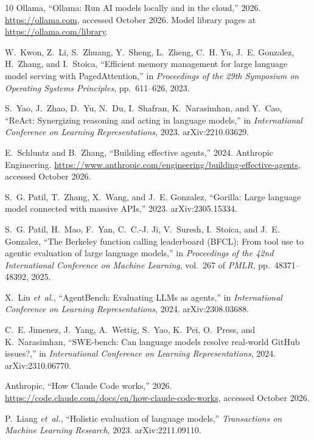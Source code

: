 \documentclass[11pt]{article}
\begin{document}
\begin{thebibliography}{10}
{Ollama}, ``{Ollama}: Run {AI} models locally and in the cloud,'' 2026.
\newblock \url{https://ollama.com}, accessed October 2026. Model library pages
  at \url{https://ollama.com/library}.

W.~Kwon, Z.~Li, S.~Zhuang, Y.~Sheng, L.~Zheng, C.~H. Yu, J.~E. Gonzalez,
  H.~Zhang, and I.~Stoica, ``Efficient memory management for large language
  model serving with {PagedAttention},'' in {\em Proceedings of the 29th
  Symposium on Operating Systems Principles}, pp.~611--626, 2023.

S.~Yao, J.~Zhao, D.~Yu, N.~Du, I.~Shafran, K.~Narasimhan, and Y.~Cao,
  ``{ReAct}: Synergizing reasoning and acting in language models,'' in {\em
  International Conference on Learning Representations}, 2023.
\newblock arXiv:2210.03629.

E.~Schluntz and B.~Zhang, ``Building effective agents,'' 2024.
\newblock Anthropic Engineering.
  \url{https://www.anthropic.com/engineering/building-effective-agents},
  accessed October 2026.

S.~G. Patil, T.~Zhang, X.~Wang, and J.~E. Gonzalez, ``Gorilla: Large language
  model connected with massive {APIs},'' 2023.
\newblock arXiv:2305.15334.

S.~G. Patil, H.~Mao, F.~Yan, C.~C.-J. Ji, V.~Suresh, I.~Stoica, and J.~E.
  Gonzalez, ``The {Berkeley} function calling leaderboard ({BFCL}): From tool
  use to agentic evaluation of large language models,'' in {\em Proceedings of
  the 42nd International Conference on Machine Learning}, vol.~267 of {\em
  PMLR}, pp.~48371--48392, 2025.

X.~Liu {\em et~al.}, ``{AgentBench}: Evaluating {LLMs} as agents,'' in {\em
  International Conference on Learning Representations}, 2024.
\newblock arXiv:2308.03688.

C.~E. Jimenez, J.~Yang, A.~Wettig, S.~Yao, K.~Pei, O.~Press, and K.~Narasimhan,
  ``{SWE-bench}: Can language models resolve real-world {GitHub} issues?,'' in
  {\em International Conference on Learning Representations}, 2024.
\newblock arXiv:2310.06770.

{Anthropic}, ``How {Claude Code} works,'' 2026.
\newblock \url{https://code.claude.com/docs/en/how-claude-code-works}, accessed
  October 2026.

P.~Liang {\em et~al.}, ``Holistic evaluation of language models,'' {\em
  Transactions on Machine Learning Research}, 2023.
\newblock arXiv:2211.09110.


\end{thebibliography}
\end{document}
